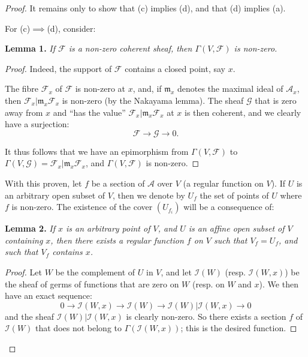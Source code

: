 \documentclass[british]{article}
\newenvironment{itenv}[1]
  {\phantomsection\par\smallskip\noindent\textbf{#1.}\itshape}
  {\par\smallskip}
\newcommand{\oldpage}[1]{\marginpar{\footnotesize$\Big\vert$ \textit{p.~#1}}}
\begin{document}
\begin{proof}
It remains only to show that (c) implies (d), and that (d) implies (a).

\bigskip

For (c)\(\implies\)(d), consider:

\protect{}\label{lemma-1}
\begin{itenv}{Lemma 1}
If \({\mathscr{F}}\) is a non-zero coherent sheaf, then
\(\Gamma(V,{\mathscr{F}})\) is non-zero.

\end{itenv}

\begin{proof}
Indeed, the support of \({\mathscr{F}}\) contains a closed point, say
\(x\).

The fibre \({\mathscr{F}}_x\) of \({\mathscr{F}}\) is non-zero at \(x\),
and, if \(\mathfrak{m}_x\) denotes the maximal ideal of
\({\mathscr{A}}_x\), then
\({\mathscr{F}}_x|\mathfrak{m}_x{\mathscr{F}}_x\) is non-zero (by the
Nakayama lemma). The sheaf \({\mathscr{G}}\) that is zero away from
\(x\) and ``has the value''
\({\mathscr{F}}_x|\mathfrak{m}_x{\mathscr{F}}_x\) at \(x\) is then
coherent, and we clearly have a surjection: \[
  {\mathscr{F}}\to{\mathscr{G}}\to0.
\]

It thus follows that we have an epimorphism from
\(\Gamma(V,{\mathscr{F}})\) to
\(\Gamma(V,{\mathscr{G}}) = {\mathscr{F}}_x|\mathfrak{m}_x{\mathscr{F}}_x\),
and \(\Gamma(V,{\mathscr{F}})\) is non-zero.
\end{proof}

With this proven, let \(f\) be a section of \({\mathscr{A}}\) over \(V\)
(a regular function on \(V\)). If \(U\) is an arbitrary open subset of
\(V\), then we denote by \(U_f\) the set of points of \(U\) where \(f\)
is non-zero. The existence of the cover \((U_{f_i})\) will be a
consequence of: \oldpage{2-06}

\protect{}\label{lemma-2}
\begin{itenv}{Lemma 2}
If \(x\) is an arbitrary point of \(V\), and \(U\) is an affine open
subset of \(V\) containing \(x\), then there exists a regular function
\(f\) on \(V\) such that \(V_f=U_f\), and such that \(V_f\) contains
\(x\).

\end{itenv}

\begin{proof}
Let \(W\) be the complement of \(U\) in \(V\), and let
\({\mathscr{I}}(W)\) (resp. \({\mathscr{I}}(W,x)\)) be the sheaf of
germs of functions that are zero on \(W\) (resp. on \(W\) and \(x\)). We
then have an exact sequence: \[
  0 \to {\mathscr{I}}(W,x) \to {\mathscr{I}}(W) \to {\mathscr{I}}(W)|{\mathscr{I}}(W,x) \to 0
\] and the sheaf \({\mathscr{I}}(W)|{\mathscr{I}}(W,x)\) is clearly
non-zero. So there exists a section \(f\) of \({\mathscr{I}}(W)\) that
does not belong to \(\Gamma({\mathscr{I}}(W,x))\); this is the desired
function.
\end{proof}


\end{proof}
\end{document}
